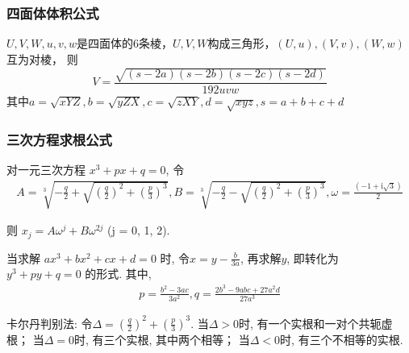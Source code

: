 \documentclass[landscape,a4paper]{article}
\begin{document}
\begin{spacing}{0.3}
\begin{multicols}{2}
\subsubsection{四面体体积公式}

$U, V, W, u, v, w$是四面体的$6$条棱，$U, V, W$构成三角形，$(U, u), (V, v), (W, w)$ 互为对棱，
则$$V = \frac{\sqrt{(s - 2a)(s - 2b)(s - 2c)(s - 2d)}}{192 uvw}$$
其中$
        a  =  \sqrt{xYZ},
        b  =  \sqrt{yZX},
        c  =  \sqrt{zXY},
        d  =  \sqrt{xyz},
        s  =  a + b + c + d
    $

\subsubsection{三次方程求根公式}
对一元三次方程
$x ^ 3 + px + q = 0$,
令
\begin{align*}
  A = \sqrt[3]{-\frac{q}{2}+\sqrt{(\frac{q}{2})^2+(\frac{p}{3})^3}},
  B = \sqrt[3]{-\frac{q}{2}-\sqrt{(\frac{q}{2})^2+(\frac{p}{3})^3}},
  \omega = \frac{(-1 + \mathrm{i} \sqrt{3})}{2}
\end{align*}

则 $x_j = A\omega^{j} + B\omega^{2j}$ (j = 0, 1, 2).

当求解 $ax ^ 3 + bx ^ 2 + cx + d = 0$ 时, 令$x = y - \frac{b}{3a}$, 再求解$y$, 即转化为$y^3 + py + q = 0$ 的形式.
其中,
\begin{align*}
  p = \frac{b^2 - 3ac}{3a^2},
  q = \frac{2b ^ 3 - 9 abc + 27 a ^ 2 d}{27 a ^ 3}
\end{align*}

卡尔丹判别法:
令$\Delta = (\frac{q}{2}) ^ 2 + (\frac{p}{3}) ^ 3$.
当$\Delta > 0$时, 有一个实根和一对个共轭虚根；
当$\Delta = 0$时, 有三个实根, 其中两个相等；
当$\Delta < 0$时, 有三个不相等的实根.


\end{multicols}
\end{spacing}
\end{document}
